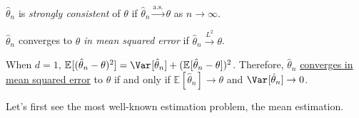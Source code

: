 \begin{definition}\label{def:strongly-consistent}
	\(\hat{\theta} _n\) is \emph{strongly consistent} of \(\theta \) if \(\hat{\theta} _n \overset{\text{a.s.} }{\to } \theta \) as \(n \to \infty \).
\end{definition}

\begin{definition}\label{def:converge-in-MSE}
	\(\hat{\theta} _n \) converges to \(\theta \) \emph{in mean squared error} if \(\hat{\theta} _n \overset{L^2}{\to } \theta \).
\end{definition}

\begin{remark}
	When \(d = 1\), \(\mathbb{E}_{}[(\hat{\theta} _n - \theta ) ^2 ] = \Var_{}[\hat{\theta} _n ] + (\mathbb{E}_{}[\hat{\theta} _n - \theta ] )^2 \). Therefore, \(\hat{\theta} _n \) \hyperref[def:converge-in-MSE]{converges in mean squared error} to \(\theta \) if and only if \(\mathbb{E}_{}[\hat{\theta} _n ] \to \theta \) and \(\Var_{}[\hat{\theta} _n ] \to 0\).
\end{remark}

Let's first see the most well-known estimation problem, the mean estimation.

